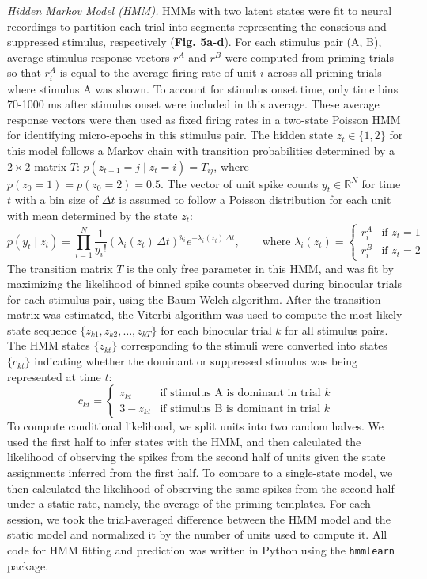 \documentclass{article}
\begin{document}
\textit{Hidden Markov Model (HMM).} HMMs with two latent states were fit to neural recordings to partition each trial into segments representing the conscious and suppressed stimulus, respectively (\textbf{Fig. 5a-d}). For each stimulus pair (A, B), average stimulus response vectors $r^A$ and $r^B$ were computed from priming trials so that $r_i^A$ is equal to the average firing rate of unit $i$ across all priming trials where stimulus A was shown. To account for stimulus onset time, only time bins 70-1000 ms after stimulus onset were included in this average. These average response vectors were then used as fixed firing rates in a two-state Poisson HMM for identifying micro-epochs in this stimulus pair. The hidden state $z_t \in \{1, 2\}$ for this model follows a Markov chain with transition probabilities determined by a $2 \times 2$ matrix $T$: $p(z_{t+1} = j \mid z_t = i) = T_{ij}$, where $p(z_0 = 1) = p(z_0 = 2) = 0.5$. The vector of unit spike counts $y_t \in \mathbb{R}^N$ for time $t$ with a bin size of $\Delta t$ is assumed to follow a Poisson distribution for each unit with mean determined by the state $z_t$:
\begin{equation*}
p(y_t \mid z_t) = \prod_{i=1}^{N} \frac{1}{y_i!} \left(\lambda_i(z_t)\,\Delta t\right)^{y_i} e^{-\lambda_i(z_t)\,\Delta t} ,
\qquad \text{where } \lambda_i(z_t) = \begin{cases} r_i^A & \text{if } z_t = 1 \\ r_i^B & \text{if } z_t = 2 \end{cases}
\end{equation*}
The transition matrix $T$ is the only free parameter in this HMM, and was fit by maximizing the likelihood of binned spike counts observed during binocular trials for each stimulus pair, using the Baum-Welch algorithm. After the transition matrix was estimated, the Viterbi algorithm was used to compute the most likely state sequence $\{z_{k1}, z_{k2}, \ldots, z_{kT}\}$ for each binocular trial $k$ for all stimulus pairs. The HMM states $\{z_{kt}\}$ corresponding to the stimuli were converted into states $\{c_{kt}\}$ indicating whether the dominant or suppressed stimulus was being represented at time $t$:
\begin{equation*}
c_{kt} = \begin{cases} z_{kt} & \text{if stimulus A is dominant in trial } k \\ 3 - z_{kt} & \text{if stimulus B is dominant in trial } k \end{cases}
\end{equation*}
To compute conditional likelihood, we split units into two random halves. We used the first half to infer states with the HMM, and then calculated the likelihood of observing the spikes from the second half of units given the state assignments inferred from the first half. To compare to a single-state model, we then calculated the likelihood of observing the same spikes from the second half under a static rate, namely, the average of the priming templates. For each session, we took the trial-averaged difference between the HMM model and the static model and normalized it by the number of units used to compute it. All code for HMM fitting and prediction was written in Python using the \texttt{hmmlearn} package.
\end{document}
